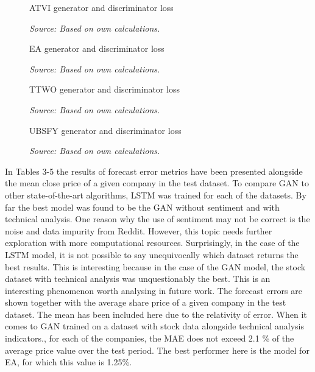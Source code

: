 \documentclass[review]{elsarticle} %
\begin{document}
\begin{figure}[H]
\caption{ATVI generator and discriminator loss}
\begin{adjustbox}{width=1.3\textwidth,center}

\end{adjustbox}
\caption*{\textit{Source: Based on own calculations.}}
\end{figure}

\begin{figure}[H]
\caption{EA generator and discriminator loss}
\begin{adjustbox}{width=1.3\textwidth,center}

\end{adjustbox}
\caption*{\textit{Source: Based on own calculations.}}
\end{figure}


\begin{figure}[H]
\caption{TTWO generator and discriminator loss}
\begin{adjustbox}{width=1.3\textwidth,center}

\end{adjustbox}
\caption*{\textit{Source: Based on own calculations.}}
\end{figure}

\begin{figure}[H]
\caption{UBSFY generator and discriminator loss}
\begin{adjustbox}{width=1.3\textwidth,center}

\end{adjustbox}
\caption*{\textit{Source: Based on own calculations.}}
\end{figure}


In Tables 3-5 the results of forecast error metrics have been presented alongside the mean close price of a given company in the test dataset. To compare GAN to other state-of-the-art algorithms, LSTM was trained for each of the datasets.
By far the best model was found to be the GAN without sentiment and with technical analysis. One reason why the use of sentiment may not be correct is the noise and data impurity from Reddit. However, this topic needs further exploration with more computational resources. 
Surprisingly, in the case of the LSTM model, it is not possible to say unequivocally which dataset returns the best results. This is interesting because in the case of the GAN model, the stock dataset with technical analysis was unquestionably the best. This is an interesting phenomenon worth analysing in future work.
The forecast errors are shown together with the average share price of a given company in the test dataset. The mean has been included here due to the relativity of error. When it comes to GAN trained on a dataset with stock data alongside technical analysis indicators., for each of the companies, the MAE does not exceed 2.1 \% of the average price value over the test period. The best performer here is the model for EA, for which this value is 1.25\%. 
\end{document}
